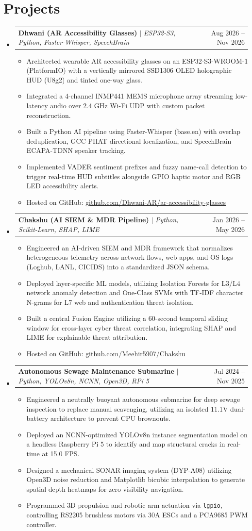 \documentclass[letterpaper,11pt]{article}
\makeatletter
\newcommand{\resumeItem}[1]{
  \item\small{
    {#1 \vspace{-2pt}}
  }
}
\newcommand{\resumeProjectHeading}[2]{
    \item
    \begin{tabular*}{0.97\textwidth}{l@{\extracolsep{\fill}}r}
      \small#1 & #2 \\
    \end{tabular*}\vspace{-8pt}
}
\newcommand{\resumeSubHeadingListStart}{\begin{itemize}[leftmargin=20pt, label={}]}
\newcommand{\resumeSubHeadingListEnd}{\end{itemize}}
\newcommand{\resumeItemListStart}{\begin{itemize}}
\newcommand{\resumeItemListEnd}{\end{itemize}\vspace{-8pt}}
\makeatother
\begin{document}
\section{Projects}
  \resumeSubHeadingListStart
    \resumeProjectHeading
      {\textbf{Dhwani (AR Accessibility Glasses)} $|$ \emph{ESP32-S3, Python, Faster-Whisper, SpeechBrain}}{Aug 2026 -- Nov 2026}
      \resumeItemListStart
        \resumeItem{Architected wearable AR accessibility glasses on an ESP32-S3-WROOM-1 (PlatformIO) with a vertically mirrored SSD1306 OLED holographic HUD (U8g2) and tinted one-way glass.}
        \resumeItem{Integrated a 4-channel INMP441 MEMS microphone array streaming low-latency audio over 2.4 GHz Wi-Fi UDP with custom packet reconstruction.}
        \resumeItem{Built a Python AI pipeline using Faster-Whisper (base.en) with overlap deduplication, GCC-PHAT directional localization, and SpeechBrain ECAPA-TDNN speaker tracking.}
        \resumeItem{Implemented VADER sentiment prefixes and fuzzy name-call detection to trigger real-time HUD subtitles alongside GPIO haptic motor and RGB LED accessibility alerts.}
        \resumeItem{Hosted on GitHub: \href{https://github.com/Dhwani-AR/ar-accessibility-glasses}{\underline{github.com/Dhwani-AR/ar-accessibility-glasses}}}
      \resumeItemListEnd

    \resumeProjectHeading
      {\textbf{Chakshu (AI SIEM \& MDR Pipeline)} $|$ \emph{Python, Scikit-Learn, SHAP, LIME}}{Jan 2026 -- May 2026}
      \resumeItemListStart
        \resumeItem{Engineered an AI-driven SIEM and MDR framework that normalizes heterogeneous telemetry across network flows, web apps, and OS logs (Loghub, LANL, CICIDS) into a standardized JSON schema.}
        \resumeItem{Deployed layer-specific ML models, utilizing Isolation Forests for L3/L4 network anomaly detection and One-Class SVMs with TF-IDF character N-grams for L7 web and authentication threat isolation.}
        \resumeItem{Built a central Fusion Engine utilizing a 60-second temporal sliding window for cross-layer cyber threat correlation, integrating SHAP and LIME for explainable threat attribution.}
        \resumeItem{Hosted on GitHub: \href{https://github.com/Meehir5907/Chakshu}{\underline{github.com/Meehir5907/Chakshu}}}
      \resumeItemListEnd

    \resumeProjectHeading
      {\textbf{Autonomous Sewage Maintenance Submarine} $|$ \emph{Python, YOLOv8n, NCNN, Open3D, RPi 5}}{Jul 2024 -- Nov 2025}
      \resumeItemListStart
        \resumeItem{Engineered a neutrally buoyant autonomous submarine for deep sewage inspection to replace manual scavenging, utilizing an isolated 11.1V dual-battery architecture to prevent CPU brownouts.}
        \resumeItem{Deployed an NCNN-optimized YOLOv8n instance segmentation model on a headless Raspberry Pi 5 to identify and map structural cracks in real-time at 15.0 FPS.}
        \resumeItem{Designed a mechanical SONAR imaging system (DYP-A08) utilizing Open3D noise reduction and Matplotlib bicubic interpolation to generate spatial depth heatmaps for zero-visibility navigation.}
        \resumeItem{Programmed 3D propulsion and robotic arm actuation via \texttt{lgpio}, controlling RS2205 brushless motors via 30A ESCs and a PCA9685 PWM controller.}
      \resumeItemListEnd
  \resumeSubHeadingListEnd
\end{document}
